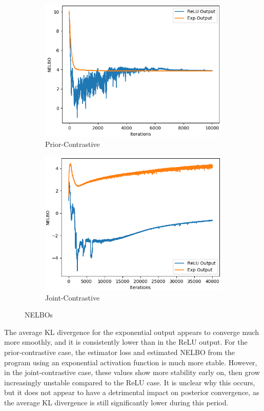 \documentclass[honours,12pt]{unswthesis}
\numberwithin{equation}{section}
\theoremstyle{definition}
\begin{document}
\begin{figure}[h!]
\begin{subfigure}{0.49\textwidth}
\includegraphics[width=\linewidth]{nelbos/PCKLvsPCKLEXP.png}
\caption{Prior-Contrastive}
\end{subfigure}
\begin{subfigure}{0.49\textwidth}
\includegraphics[width=\linewidth]{nelbos/JCKLvsJCKLEXP.png}
\caption{Joint-Contrastive}
\end{subfigure}
\caption{NELBOs}
\end{figure}
 The average KL divergence for the exponential output appears to converge much more smoothly, and it is consistently lower than in the ReLU output. For the prior-contrastive case, the estimator loss and estimated NELBO from the program using an exponential activation function is much more stable. However, in the joint-contrastive case, these values show more stability early on, then grow increasingly unstable compared to the ReLU case. It is unclear why this occurs, but it does not appear to have a detrimental impact on posterior convergence, as the average KL divergence is still significantly lower during this period.
\end{document}
